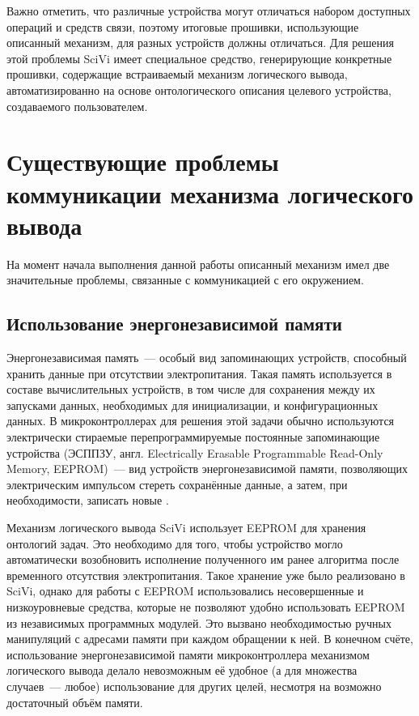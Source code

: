 Важно отметить, что различные устройства могут отличаться набором доступных операций и средств связи, поэтому итоговые прошивки, использующие описанный механизм, для разных устройств должны отличаться.
Для решения этой проблемы SciVi имеет специальное средство, генерирующие конкретные прошивки, содержащие встраиваемый механизм логического вывода, автоматизированно на основе онтологического описания целевого устройства, создаваемого пользователем.

\section{Существующие проблемы коммуникации механизма логического вывода}

На момент начала выполнения данной работы описанный механизм имел две значительные проблемы, связанные с коммуникацией с его окружением.

\subsection{Использование энергонезависимой памяти}

Энергонезависимая память~--- особый вид запоминающих устройств, способный хранить данные при отсутствии электропитания.
Такая память используется в составе вычислительных устройств, в том числе для сохранения между их запусками данных, необходимых для инициализации, и конфигурационных данных.
В микроконтроллерах для решения этой задачи обычно используются электрически стираемые перепрограммируемые постоянные запоминающие устройства (ЭСППЗУ, англ. Electrically Erasable Programmable Read-Only Memory, EEPROM)~--- вид устройств энергонезависимой памяти, позволяющих электрическим импульсом стереть сохранённые данные, а затем, при необходимости, записать новые \cite{incollection:eeprom-proposal, article:eeprom}.

Механизм логического вывода SciVi использует EEPROM для хранения онтологий задач.
Это необходимо для того, чтобы устройство могло автоматически возобновить исполнение полученного им ранее алгоритма после временного отсутствия электропитания.
Такое хранение уже было реализовано в SciVi, однако для работы с EEPROM использовались несовершенные и низкоуровневые средства, которые не позволяют удобно использовать EEPROM из независимых программных модулей.
Это вызвано необходимостью ручных манипуляций с адресами памяти при каждом обращении к ней.
В конечном счёте, использование энергонезависимой памяти микроконтроллера механизмом логического вывода делало невозможным её удобное (а для множества случаев~--- любое) использование для других целей,
несмотря на возможно достаточный объём памяти.


